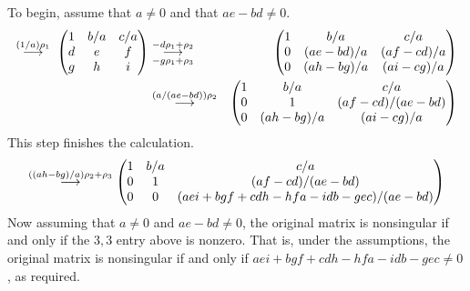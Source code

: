 \begin{exercises}
\begin{answer}
      To begin, assume that \( a\neq 0 \) and that \( ae-bd\neq 0 \).
      \begin{eqnarray*}
        \grstep{(1/a)\rho_1}\;
        \begin{pmatrix}
           1   &b/a   &c/a   \\
           d   &e     &f     \\
           g   &h     &i
         \end{pmatrix}                                           
        &\grstep[-g\rho_1+\rho_3]{-d\rho_1+\rho_2}
        &\begin{pmatrix}
           1   &b/a           &c/a           \\
           0   &(ae-bd)/a     &(af-cd)/a     \\
           0   &(ah-bg)/a     &(ai-cg)/a
         \end{pmatrix}                                            \\
        &\grstep{(a/(ae-bd))\rho_2}
        &\begin{pmatrix}
           1   &b/a           &c/a             \\
           0   &1             &(af-cd)/(ae-bd) \\
           0   &(ah-bg)/a     &(ai-cg)/a
         \end{pmatrix}
      \end{eqnarray*}
      This step finishes the calculation.
      \begin{equation*}
        \grstep{((ah-bg)/a)\rho_2+\rho_3}
        \begin{pmatrix}
           1   &b/a    &c/a             \\
           0   &1      &(af-cd)/(ae-bd)      \\
           0   &0      &(aei+bgf+cdh-hfa-idb-gec)/(ae-bd)
         \end{pmatrix}
      \end{equation*}
      Now assuming that $a\neq 0$ and \( ae-bd\neq 0 \), 
      the original matrix is nonsingular
      if and only if the \( 3,3 \) entry above is nonzero.
      That is, under the assumptions, the original matrix is
      nonsingular if and only if $aei+bgf+cdh-hfa-idb-gec\neq 0$,
      as required.


\end{answer}
\end{exercises}
